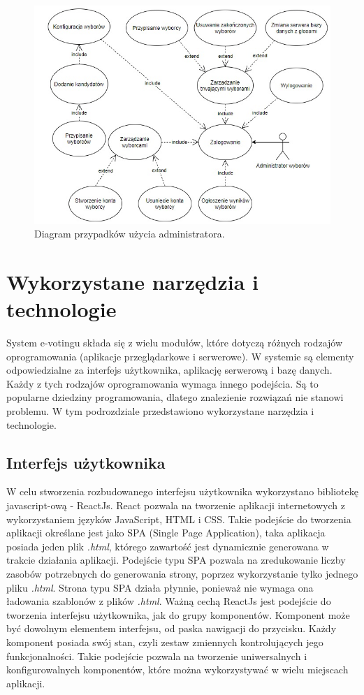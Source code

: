\documentclass[a4paper,12pt]{book}
\begin{document}
\begin{figure}[h]
	\centering
	\includegraphics[width=\textwidth]{images/admin_use_case.jpg}
	\caption{Diagram przypadków użycia administratora.}\label{admin-use}
\end {figure}

\section {Wykorzystane narzędzia i technologie}

System e-votingu składa się z wielu modułów, które dotyczą różnych rodzajów oprogramowania (aplikacje przeglądarkowe i serwerowe). W systemie są elementy odpowiedzialne za interfejs użytkownika, aplikację serwerową i bazę danych. Każdy z tych rodzajów oprogramowania wymaga innego podejścia. Są to popularne dziedziny programowania, dlatego znalezienie rozwiązań nie stanowi problemu. W tym podrozdziale przedstawiono wykorzystane narzędzia i technologie.

\subsection{Interfejs użytkownika}

W celu stworzenia rozbudowanego interfejsu użytkownika wykorzystano bibliotekę javascript-ową - ReactJs. React pozwala na tworzenie aplikacji internetowych z wykorzystaniem języków JavaScript, HTML i CSS. Takie podejście do tworzenia aplikacji określane jest jako SPA (Single Page Application), taka aplikacja posiada jeden plik \textit{.html}, którego zawartość jest dynamicznie generowana w trakcie działania aplikacji. Podejście typu SPA pozwala na zredukowanie liczby zasobów potrzebnych do generowania strony, poprzez wykorzystanie tylko jednego pliku \textit{.html}. Strona typu SPA działa płynnie, ponieważ nie wymaga ona ładowania szablonów z plików \textit{.html}. Ważną cechą ReactJs jest podejście do tworzenia interfejsu użytkownika, jak do grupy komponentów. Komponent może być dowolnym elementem interfejsu, od paska nawigacji do przycisku. Każdy komponent posiada swój stan, czyli zestaw zmiennych kontrolujących jego funkcjonalności. Takie podejście pozwala na tworzenie uniwersalnych i konfigurowalnych komponentów, które można wykorzystywać w wielu miejscach aplikacji.
\end{document}
